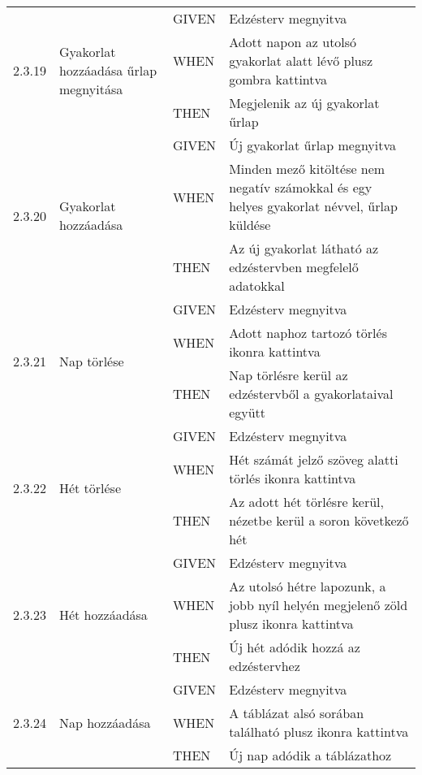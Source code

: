 \begin{center}
\begin{longtable}{ | p{} | p{} | p{} | p{} | }
			\multirow{3}{*}{2.3.19} 
			& \multirow{3}{=}{Gyakorlat hozzáadása űrlap megnyitása} 
			& GIVEN 
			& Edzésterv megnyitva \\
			\cline{3-4}
			& & WHEN 
			& Adott napon az utolsó gyakorlat alatt lévő plusz gombra kattintva \\
			\cline{3-4}
			& & THEN 
			& Megjelenik az új gyakorlat űrlap \\
			\hline

			\multirow{3}{*}{2.3.20} 
			& \multirow{3}{=}{Gyakorlat hozzáadása} 
			& GIVEN 
			& Új gyakorlat űrlap megnyitva \\
			\cline{3-4}
			& & WHEN 
			& Minden mező kitöltése nem negatív számokkal és egy helyes gyakorlat névvel, űrlap küldése \\
			\cline{3-4}
			& & THEN 
			& Az új gyakorlat látható az edzéstervben megfelelő adatokkal \\
			\hline

			\multirow{3}{*}{2.3.21} 
			& \multirow{3}{=}{Nap törlése} 
			& GIVEN 
			& Edzésterv megnyitva \\
			\cline{3-4}
			& & WHEN 
			& Adott naphoz tartozó törlés ikonra kattintva \\
			\cline{3-4}
			& & THEN 
			& Nap törlésre kerül az edzéstervből a gyakorlataival együtt \\
			\hline

			\multirow{3}{*}{2.3.22} 
			& \multirow{3}{=}{Hét törlése} 
			& GIVEN 
			& Edzésterv megnyitva \\
			\cline{3-4}
			& & WHEN 
			& Hét számát jelző szöveg alatti törlés ikonra kattintva \\
			\cline{3-4}
			& & THEN 
			& Az adott hét törlésre kerül, nézetbe kerül a soron következő hét \\
			\hline

			\multirow{3}{*}{2.3.23} 
			& \multirow{3}{=}{Hét hozzáadása} 
			& GIVEN 
			& Edzésterv megnyitva \\
			\cline{3-4}
			& & WHEN 
			& Az utolsó hétre lapozunk, a jobb nyíl helyén megjelenő zöld plusz ikonra kattintva \\
			\cline{3-4}
			& & THEN 
			& Új hét adódik hozzá az edzéstervhez \\
			\hline

			\multirow{3}{*}{2.3.24} 
			& \multirow{3}{=}{Nap hozzáadása} 
			& GIVEN 
			& Edzésterv megnyitva \\
			\cline{3-4}
			& & WHEN 
			& A táblázat alsó sorában található plusz ikonra kattintva \\
			\cline{3-4}
			& & THEN 
			& Új nap adódik a táblázathoz \\
			\hline


\end{longtable}
\end{center}
